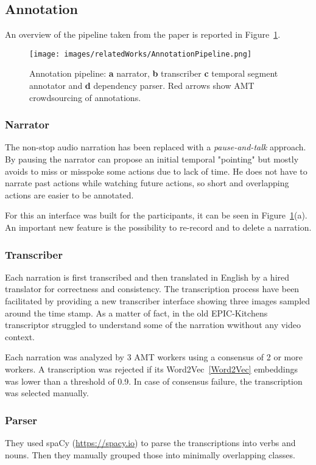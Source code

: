 \subsection{Annotation}
An overview of the pipeline taken from the paper is reported in Figure~\ref{fig:e100_ann}.
\begin{figure}
    \centering
    \texttt{[image: images/relatedWorks/AnnotationPipeline.png]} 
    \caption{Annotation pipeline: \textbf{a} narrator, \textbf{b} transcriber
    \textbf{c} temporal segment annotator and \textbf{d} dependency parser.
    Red arrows show AMT crowdsourcing of annotations.}\label{fig:e100_ann}
\end{figure}
\subsubsection{Narrator}
The non-stop audio narration has been replaced with a \textit{pause-and-talk} approach.
By pausing the narrator can propose an initial temporal "pointing" but mostly avoids
to miss or misspoke some actions due to lack of time. He does not have to narrate
past actions while watching future actions, so short and overlapping actions are easier
to be annotated.

For this an interface was built for the participants, it can be seen in Figure~\ref{fig:e100_ann}(a).
An important new feature is the possibility to re-record and to delete a narration.

\subsubsection{Transcriber}
Each narration is first transcribed and then translated in English by a hired translator for correctness
and consistency. The transcription process have been facilitated by providing a new transcriber
interface showing three images sampled around the time stamp. As a matter of fact, in the 
old EPIC-Kitchens transcriptor struggled to understand some of the narration wwithout
any video context.

Each narration was analyzed by 3 AMT workers using a consensus of 2 or more workers.
A transcription was rejected if its Word2Vec~\ref{Word2Vec} embeddings was lower than a threshold of 0.9.
In case of consensus failure, the transcription was selected manually.

\subsubsection{Parser}
They used spaCy (\url{https://spacy.io}) to parse the transcriptions into verbs and nouns.
Then they manually grouped those into minimally overlapping classes.
